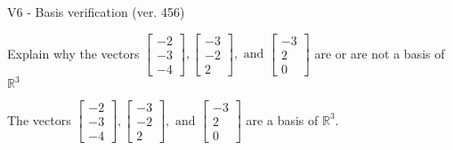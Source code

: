 \begin{exercise}
  \begin{exerciseTitle}V6 - Basis verification (ver. 456)\end{exerciseTitle}
  \begin{exerciseStatement}
    Explain why the vectors \(\left[\begin{array}{r}
-2 \\
-3 \\
-4
\end{array}\right] , \left[\begin{array}{r}
-3 \\
-2 \\
2
\end{array}\right] , \text{ and } \left[\begin{array}{r}
-3 \\
2 \\
0
\end{array}\right]\) are or are not a basis of \(\mathbb{R}^3\)	


  \end{exerciseStatement}
  \begin{exerciseAnswer}
   The vectors \(\left[\begin{array}{r}
-2 \\
-3 \\
-4
\end{array}\right] , \left[\begin{array}{r}
-3 \\
-2 \\
2
\end{array}\right] , \text{ and } \left[\begin{array}{r}
-3 \\
2 \\
0
\end{array}\right]\) 
  	 are  a basis of \(\mathbb{R}^3\).
  


  \end{exerciseAnswer}
\end{exercise}
